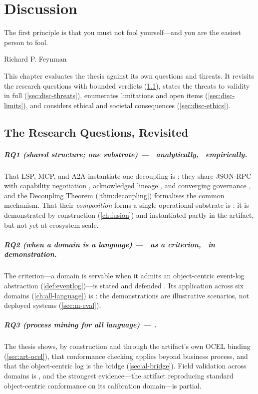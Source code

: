 \chapter{Discussion}
\label{ch:discussion}

\epigraph{The first principle is that you must not fool yourself---and you are the
easiest person to fool.}{Richard P. Feynman}

This chapter evaluates the thesis against its own questions and threats. It
revisits the research questions with bounded verdicts (\cref{sec:disc-rqs}), states
the threats to validity in full (\cref{sec:disc-threats}), enumerates limitations
and open items (\cref{sec:disc-limits}), and considers ethical and societal
consequences (\cref{sec:disc-ethics}).

\section{The Research Questions, Revisited}
\label{sec:disc-rqs}

\paragraph{RQ1 (shared structure; one substrate) --- \admitted\ analytically,
\candidate\ empirically.} That LSP, MCP, and A2A instantiate one decoupling is
\admitted: they share JSON-RPC with capability negotiation
\citep{lsp-spec-318,mcp-spec-2025,a2a-spec}, acknowledged lineage
\citep{mcp-spec-2025,a2a-mcp}, and converging governance
\citep{lf-a2a-press,lf-aaif-press}, and the Decoupling Theorem (\cref{thm:decoupling})
formalises the common mechanism. That their \emph{composition} forms a single
operational substrate is \candidate: it is demonstrated by construction
(\cref{ch:fusion}) and instantiated partly in the artifact, but not yet at
ecosystem scale.

\paragraph{RQ2 (when a domain is a language) --- \admitted\ as a criterion,
\candidate\ in demonstration.} The criterion---a domain is servable when it admits
an object-centric event-log abstraction (\cref{def:eventlog})---is stated and
defended \admitted. Its application across six domains (\cref{ch:all-language}) is
\candidate: the demonstrations are illustrative scenarios, not deployed systems
(\cref{sec:m-eval}).

\paragraph{RQ3 (process mining for all language) --- \candidate.} The thesis shows,
by construction and through the artifact's own OCEL binding (\cref{sec:art-ocel}),
that conformance checking applies beyond business process, and that the
object-centric log is the bridge (\cref{sec:al-bridge}). Field validation across
domains is \openstat, and the strongest evidence---the artifact reproducing
standard object-centric conformance on its calibration domain---is partial.

